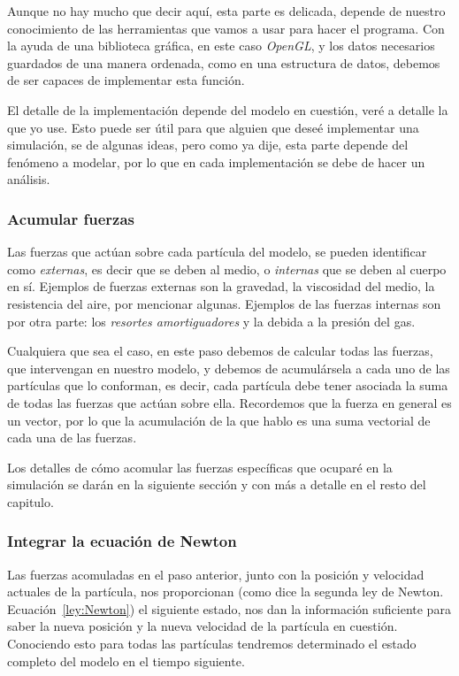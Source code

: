 Aunque no hay mucho que decir aquí, esta parte es delicada, depende de nuestro conocimiento de las herramientas que vamos a usar para hacer el programa. Con la ayuda de una biblioteca gráfica, en este caso \emph{\foreignlanguage{english}{OpenGL}}, y los datos necesarios guardados de una manera ordenada, como en una estructura de datos, debemos de ser capaces de implementar esta función.

El detalle de la implementación depende del modelo en cuestión, veré a detalle la que yo use. Esto puede ser útil para que alguien que deseé implementar una simulación, se de algunas ideas, pero como ya dije, esta parte depende del fenómeno a modelar, por lo que en cada implementación se debe de hacer un análisis.

\subsubsection{Acumular fuerzas}
Las fuerzas que actúan sobre cada partícula del modelo, se pueden identificar como \emph{externas}, es decir que se deben al medio, o \emph{internas} que se deben al cuerpo en sí. Ejemplos de fuerzas externas son la gravedad, la viscosidad del medio, la resistencia del aire, por mencionar algunas. Ejemplos de las fuerzas internas son por otra parte: los \emph{resortes amortiguadores} y la debida a la presión del gas.

Cualquiera que sea el caso, en este paso debemos de calcular todas las fuerzas, que intervengan en nuestro modelo, y debemos de acumulársela a cada uno de las partículas que lo conforman, es decir, cada partícula debe tener asociada la suma de todas las fuerzas que actúan sobre ella. Recordemos que la fuerza en general es un vector, por lo que la acumulación de la que hablo es una suma vectorial de cada una de las fuerzas.

Los detalles de cómo acomular las fuerzas específicas que ocuparé en la simulación se darán en la siguiente sección y con más a detalle en el resto del capitulo.

\subsubsection{Integrar la ecuación de Newton}
Las fuerzas acomuladas en el paso anterior, junto con la posición y velocidad actuales de la partícula, nos proporcionan (como dice la segunda ley de Newton. Ecuación~\ref{ley:Newton}) el siguiente estado, nos dan la información suficiente para saber la nueva posición y la nueva velocidad de la partícula en cuestión. Conociendo esto para todas las partículas tendremos determinado el estado completo del modelo en el tiempo siguiente.


